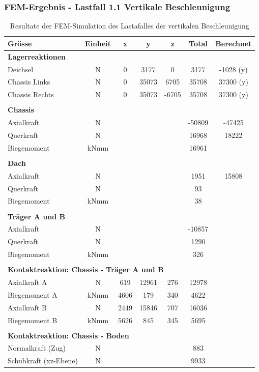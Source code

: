   \subsubsection{FEM-Ergebnis - Lastfall 1.1 Vertikale Beschleunigung}
  \begin{table}[H]
  \centering
  \begin{tabular}{lcccccc}
  Grösse	&	Einheit	&	x	&	y	&	z	&	Total	&	Berechnet	\\	\hline
  \multicolumn{5}{l}{\textbf{Lagerreaktionen}}									&		&		\\	\thickhline
  Deichsel	&	N	&	0	&	3177	&	0	&	3177	&	-1028 (y)	\\
  Chassis Links	&	N	&	0	&	35073	&	6705	&	35708	&	37300 (y)	\\
  Chassis Rechts	&	N	&	0	&	35073	&	-6705	&	35708	&	37300 (y)	\\	\hline	\\
  \multicolumn{5}{l}{\textbf{Chassis}}									&		&		\\	\thickhline
  Axialkraft	&	N	&		&		&		&	-50809	&	-47425	\\
  Querkraft	&	N	&		&		&		&	16968	&	18222\footnotemark \\
  Biegemoment	&	kNmm	&		&		&		&	16961	&		\\	\hline	\\
  \multicolumn{5}{l}{\textbf{Dach}}									&		&		\\	\thickhline
  Axialkraft	&	N	&		&		&		&	1951	&	15808	\\
  Querkraft	&	N	&		&		&		&	93	&		\\
  Biegemoment	&	kNmm	&		&		&		&	38	&		\\	\hline	\\
  \multicolumn{5}{l}{\textbf{Träger A und B}}													\\	\thickhline
  Axialkraft	&	N	&		&		&		&	-10857	&		\\
  Querkraft	&	N	&		&		&		&	1290	&		\\
  Biegemoment	&	kNmm	&		&		&		&	326	&		\\	\hline	\\
  \multicolumn{5}{l}{\textbf{Kontaktreaktion: Chassis - Träger A und B}}									&		&		\\	\thickhline
  Axialkraft A	&	N	&	619	&	12961	&	276	&	12978	&		\\
  Biegemoment A	&	kNmm	&	4606	&	179	&	340	&	4622	&		\\
  Axialkraft B	&	N	&	2449	&	15846	&	707	&	16036	&		\\
  Biegemoment B	&	kNmm	&	5626	&	845	&	345	&	5695	&		\\	\hline	\\
  \multicolumn{5}{l}{\textbf{Kontaktreaktion: Chassis - Boden}}									&		&		\\	\thickhline
  Normalkraft (Zug)	&	N	&		&		&		&	883	&		\\
  Schubkraft (xz-Ebene)	&	N	&		&		&		&	9933	&		\\	\hline
  \end{tabular}
  \caption{Resultate der FEM-Simulation des Lastafalles der vertikalen Beschleunigung}
  \label{tab:FEM 1.1}
  \end{table}
